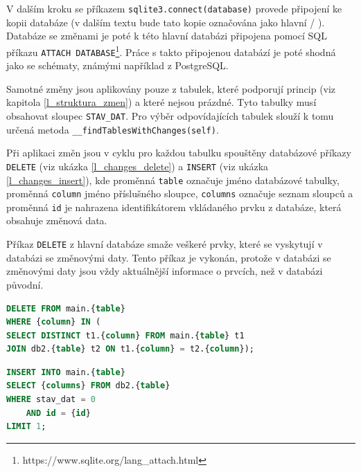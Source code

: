 \documentclass[a4paper,12pt,oneside]{book}
\begin{document}
V dalším kroku se příkazem \texttt{sqlite3.connect(database)} provede připojení ke kopii databáze (v dalším textu bude tato kopie označována jako hlavní / ). Databáze se změnami je poté k této hlavní databázi připojena pomocí SQL příkazu \texttt{ATTACH DATABASE}\footnote{https://www.sqlite.org/lang\_attach.html}. Práce s takto připojenou databází je poté shodná jako se schématy, známými například z PostgreSQL.

Samotné změny jsou aplikovány pouze z tabulek, které podporují princip  (viz kapitola \ref{l_struktura_zmen}) a které nejsou prázdné. Tyto tabulky musí obsahovat sloupec \texttt{STAV\_DAT}. Pro výběr odpovídajících tabulek slouží k tomu určená metoda \texttt{\_\_findTablesWithChanges(self)}.

Při aplikaci změn jsou v cyklu pro každou tabulku spouštěny databázové příkazy \texttt{DELETE} (viz ukázka \ref{l_changes_delete}) a \texttt{INSERT} (viz ukázka \ref{l_changes_insert}), kde proměnná \texttt{table} označuje jméno databázové tabulky, proměnná \texttt{column} jméno příslušného sloupce,  \texttt{columns} označuje seznam sloupců a proměnná \texttt{id} je nahrazena identifikátorem vkládaného prvku z databáze, která obsahuje změnová data.

Příkaz \texttt{DELETE} z hlavní databáze smaže veškeré prvky, které se vyskytují v databázi se změnovými daty. Tento příkaz je vykonán, protože v databázi se změnovými daty jsou vždy aktuálnější informace o prvcích, než v databázi původní. 

\begin{lstlisting}[language=SQL, 
		    caption={Aplikace změn -- příkaz DELETE}, 
		    keywordstyle=\color{blue}\ttfamily,
		    stringstyle=\color{red}\ttfamily,
		    commentstyle=\color{green}\ttfamily, morekeywords={},
		    label=l_changes_delete]
DELETE FROM main.{table} 
WHERE {column} IN (
SELECT DISTINCT t1.{column} FROM main.{table} t1 
JOIN db2.{table} t2 ON t1.{column} = t2.{column});
\end{lstlisting}

\begin{lstlisting}[language=SQL, 
		    caption={Aplikace změn -- příkaz INSERT}, 
		    keywordstyle=\color{blue}\ttfamily,
		    stringstyle=\color{red}\ttfamily,
		    commentstyle=\color{green}\ttfamily, morekeywords={},
		    label=l_changes_insert]
INSERT INTO main.{table}
SELECT {columns} FROM db2.{table}
WHERE stav_dat = 0
    AND id = {id}
LIMIT 1;
\end{lstlisting}
\end{document}
